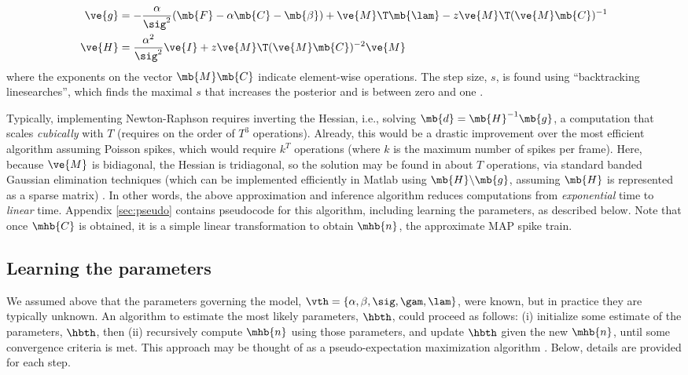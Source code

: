 \begin{subequations} \label{eq:NR}
\begin{align}
\ve{g} &= -\frac{\alpha}{\sig^2}(\mb{F} -\alpha \mb{C} - \mb{\beta}) + \ve{M}\T\mb{\lam} - \zzz \ve{M}\T (\ve{M} \mb{C})^{-1} \label{eq:g} \\
\ve{H} &= \frac{\alpha^2}{\sig^2} \ve{I} + \zzz \ve{M}\T (\ve{M} \mb{C})^{-2} \ve{M} \label{eq:H}
\end{align}
\end{subequations}
\noindent where the exponents on the vector $\mb{M} \mb{C}$ indicate element-wise operations. The step size, $s$, is found using ``backtracking linesearches'', which finds the maximal $s$ that increases the posterior and is between zero and one \cite{Press92}.

Typically, implementing Newton-Raphson requires inverting the Hessian, i.e.,  solving $\mb{d} = \mb{H}^{-1} \mb{g}$, a computation that scales \emph{cubically} with $T$ (requires on the order of $T^3$ operations). Already, this would be a drastic improvement over the most efficient algorithm assuming Poisson spikes, which would require $k^T$ operations (where $k$ is the maximum number of spikes per frame).  Here, because $\ve{M}$ is bidiagonal, the Hessian is tridiagonal, so the solution may be found in about $T$ operations, via standard banded Gaussian elimination techniques (which can be implemented efficiently in Matlab using $\mb{H} \backslash \mb{g}$, assuming $\mb{H}$ is represented as a sparse matrix) \cite{PaninskiWu09}. In other words, the above approximation and inference algorithm reduces computations from \emph{exponential} time to \emph{linear} time.  Appendix \ref{sec:pseudo} contains pseudocode for this algorithm, including learning the parameters, as described below. Note that once $\mhb{C}$ is obtained, it is a simple linear transformation to obtain $\mhb{n}$, the approximate MAP spike train.





\subsection{Learning the parameters} \label{sec:learn}

We assumed above that the parameters governing the model, $\vth=\{\alpha, \beta, \sig, \gam, \lam\}$, were known, but in practice they are typically unknown. An algorithm to estimate the most likely parameters, $\hbth$, could proceed as follows: (i) initialize some estimate of the parameters, $\hbth$, then (ii) recursively compute $\mhb{n}$ using those parameters, and update $\hbth$ given the new $\mhb{n}$, until some convergence criteria is met.  This approach may be thought of as a pseudo-expectation maximization algorithm \cite{DempsterRubin77}. Below, details are provided for each step.

